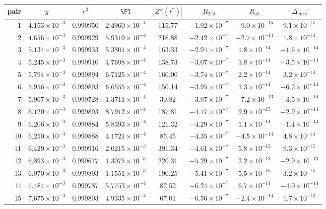 \begin{tabular}{@{}rccccccc@{}}
\toprule
pair & $g$ & $r^{2}$ & $\Fl$ & $|Z''(t^{*})|$ & $R_{250}$ & $R_{\mathrm{all}}$ & $\Delta_{\mathrm{curv}}$\\
\midrule
1 & $4.153\times10^{-3}$ & 0.999950 & $2.4960\times10^{-4}$ & 115.77 & $-1.92\times10^{-7}$ & $-9.0\times10^{-15}$ & $9.1\times10^{-15}$\\
2 & $4.656\times10^{-3}$ & 0.999929 & $5.9310\times10^{-4}$ & 218.88 & $-2.42\times10^{-7}$ & $-2.7\times10^{-14}$ & $1.8\times10^{-14}$\\
3 & $5.134\times10^{-3}$ & 0.999933 & $5.3801\times10^{-4}$ & 163.33 & $-2.94\times10^{-7}$ & $1.8\times10^{-14}$ & $-1.6\times10^{-14}$\\
4 & $5.245\times10^{-3}$ & 0.999910 & $4.7698\times10^{-4}$ & 138.73 & $-3.07\times10^{-7}$ & $3.8\times10^{-14}$ & $-3.5\times10^{-14}$\\
5 & $5.794\times10^{-3}$ & 0.999894 & $6.7125\times10^{-4}$ & 160.00 & $-3.74\times10^{-7}$ & $2.2\times10^{-14}$ & $3.2\times10^{-14}$\\
6 & $5.956\times10^{-3}$ & 0.999893 & $6.6555\times10^{-4}$ & 150.14 & $-3.95\times10^{-7}$ & $3.3\times10^{-14}$ & $-6.2\times10^{-14}$\\
7 & $5.967\times10^{-3}$ & 0.999728 & $1.3711\times10^{-4}$ & 30.82 & $-3.97\times10^{-7}$ & $-7.2\times10^{-13}$ & $-4.5\times10^{-14}$\\
8 & $6.120\times10^{-3}$ & 0.999893 & $8.7912\times10^{-4}$ & 187.81 & $-4.17\times10^{-7}$ & $9.9\times10^{-15}$ & $-2.9\times10^{-14}$\\
9 & $6.206\times10^{-3}$ & 0.999884 & $5.8393\times10^{-4}$ & 121.32 & $-4.29\times10^{-7}$ & $1.1\times10^{-14}$ & $-1.4\times10^{-14}$\\
10 & $6.250\times10^{-3}$ & 0.999888 & $4.1721\times10^{-4}$ & 85.45 & $-4.35\times10^{-7}$ & $-4.5\times10^{-14}$ & $4.8\times10^{-14}$\\
11 & $6.429\times10^{-3}$ & 0.999916 & $2.0215\times10^{-3}$ & 391.34 & $-4.61\times10^{-7}$ & $5.8\times10^{-15}$ & $9.3\times10^{-15}$\\
12 & $6.893\times10^{-3}$ & 0.999677 & $1.3075\times10^{-3}$ & 220.31 & $-5.29\times10^{-7}$ & $2.2\times10^{-13}$ & $-2.9\times10^{-13}$\\
13 & $6.970\times10^{-3}$ & 0.999893 & $1.1551\times10^{-3}$ & 190.25 & $-5.41\times10^{-7}$ & $5.5\times10^{-15}$ & $3.2\times10^{-15}$\\
14 & $7.484\times10^{-3}$ & 0.999787 & $5.7753\times10^{-4}$ & 82.52 & $-6.24\times10^{-7}$ & $6.7\times10^{-14}$ & $-4.0\times10^{-14}$\\
15 & $7.675\times10^{-3}$ & 0.999803 & $4.9335\times10^{-4}$ & 67.01 & $-6.56\times10^{-7}$ & $-2.4\times10^{-14}$ & $1.7\times10^{-13}$\\
\bottomrule
\end{tabular}
